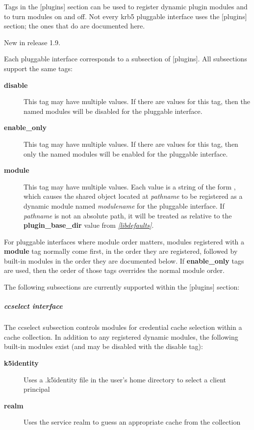 \documentclass[letterpaper,10pt,english]{sphinxmanual}
\begin{document}
Tags in the {[}plugins{]} section can be used to register dynamic plugin
modules and to turn modules on and off.  Not every krb5 pluggable
interface uses the {[}plugins{]} section; the ones that do are documented
here.

New in release 1.9.

Each pluggable interface corresponds to a subsection of {[}plugins{]}.
All subsections support the same tags:
\begin{description}
\item[{\textbf{disable}}] \leavevmode
This tag may have multiple values. If there are values for this
tag, then the named modules will be disabled for the pluggable
interface.

\item[{\textbf{enable\_only}}] \leavevmode
This tag may have multiple values. If there are values for this
tag, then only the named modules will be enabled for the pluggable
interface.

\item[{\textbf{module}}] \leavevmode
This tag may have multiple values.  Each value is a string of the
form , which causes the shared object
located at \emph{pathname} to be registered as a dynamic module named
\emph{modulename} for the pluggable interface.  If \emph{pathname} is not an
absolute path, it will be treated as relative to the
\textbf{plugin\_base\_dir} value from {\hyperref[admin/conf_files/krb5_conf:libdefaults]{\emph{{[}libdefaults{]}}}}.

\end{description}

For pluggable interfaces where module order matters, modules
registered with a \textbf{module} tag normally come first, in the order
they are registered, followed by built-in modules in the order they
are documented below.  If \textbf{enable\_only} tags are used, then the
order of those tags overrides the normal module order.

The following subsections are currently supported within the {[}plugins{]}
section:


\subparagraph{ccselect interface}
\label{admin/conf_files/krb5_conf:ccselect}\label{admin/conf_files/krb5_conf:ccselect-interface}
The ccselect subsection controls modules for credential cache
selection within a cache collection.  In addition to any registered
dynamic modules, the following built-in modules exist (and may be
disabled with the disable tag):
\begin{description}
\item[{\textbf{k5identity}}] \leavevmode
Uses a .k5identity file in the user's home directory to select a
client principal

\item[{\textbf{realm}}] \leavevmode
Uses the service realm to guess an appropriate cache from the
collection

\end{description}
\end{document}
